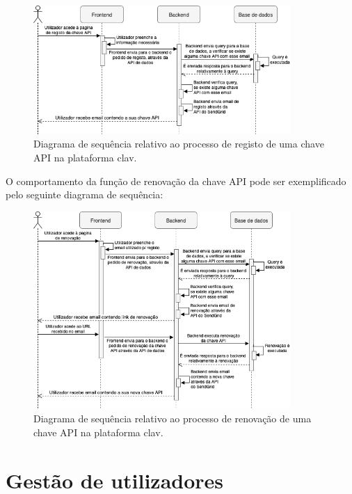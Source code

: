 \begin{figure}[H]
    \centering
    \includegraphics[width=0.87\textwidth]{img/diagramas/sequencia/DiagramasSequencia-RegistoAPI.png}
    \caption{Diagrama de sequência relativo ao processo de registo de uma chave API na plataforma \gls{clav}.}
    \label{fig:diagramaSequenciaRegistoAPI}
\end{figure}
\vspace{-5mm}
O comportamento da função de renovação da chave API pode ser exemplificado pelo seguinte diagrama de sequência:
\vspace{-2mm}
\begin{figure}[H]
    \centering
    \includegraphics[width=0.87\textwidth]{img/diagramas/sequencia/DiagramasSequencia-RenovacaoAPI.png}
    \caption{Diagrama de sequência relativo ao processo de renovação de uma chave API na plataforma \gls{clav}.}
    \label{fig:diagramaSequenciaRenovacaoAPI}
\end{figure}

\cleardoublepage
\section{Gestão de utilizadores}

